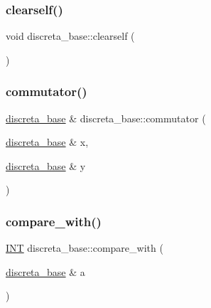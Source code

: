 \mbox{\label{classdiscreta__base_acc3985eac311491ab6ea3e409cffd3c4}} 
\subsubsection{\texorpdfstring{clearself()}{clearself()}}
{\footnotesize\ttfamily void discreta\+\_\+base\+::clearself (\begin{DoxyParamCaption}{ }\end{DoxyParamCaption})\hspace{0.3cm}{\ttfamily [inline]}}

\mbox{\label{classdiscreta__base_a1d0bb4144e3eb15aaf877a0cea656c00}} 
\subsubsection{\texorpdfstring{commutator()}{commutator()}}
{\footnotesize\ttfamily \mbox{\hyperlink{classdiscreta__base}{discreta\+\_\+base}} \& discreta\+\_\+base\+::commutator (\begin{DoxyParamCaption}\item[{\mbox{\hyperlink{classdiscreta__base}{discreta\+\_\+base}} \&}]{x,  }\item[{\mbox{\hyperlink{classdiscreta__base}{discreta\+\_\+base}} \&}]{y }\end{DoxyParamCaption})}

\mbox{\label{classdiscreta__base_a3818444c4301d0b7ed47c3b850ea6c60}} 
\subsubsection{\texorpdfstring{compare\+\_\+with()}{compare\_with()}}
{\footnotesize\ttfamily \mbox{\hyperlink{galois_8h_a09fddde158a3a20bd2dcadb609de11dc}{I\+NT}} discreta\+\_\+base\+::compare\+\_\+with (\begin{DoxyParamCaption}\item[{\mbox{\hyperlink{classdiscreta__base}{discreta\+\_\+base}} \&}]{a }\end{DoxyParamCaption})\hspace{0.3cm}{\ttfamily [virtual]}}



